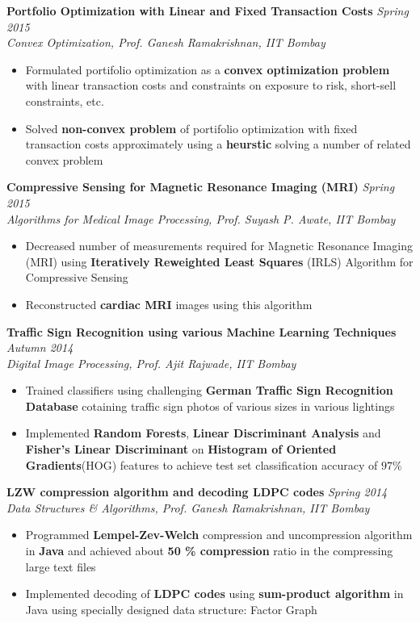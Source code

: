 \documentclass[a4paper,10pt]{article}
\newcommand{\ressubheadingWithGuide}[3]{%

	\textbf{#1} \hfill \textit{#2}\null\\
	\textit{\small #3} %
	\vspace{-4pt}
}
\begin{document}
	\ressubheadingWithGuide{Portfolio Optimization with Linear and Fixed Transaction Costs}{Spring 2015}{Convex Optimization, Prof. Ganesh Ramakrishnan, IIT Bombay}
		\begin{itemize} \itemsep -1pt
				\item Formulated portifolio optimization as a \textbf{convex optimization problem} with linear transaction costs and constraints on exposure to risk, short-sell constraints, etc.
				\item Solved \textbf{non-convex problem} of portifolio optimization with fixed transaction costs approximately using a \textbf{heurstic} solving a number of related convex problem
		\end{itemize}

	\ressubheadingWithGuide{Compressive Sensing for Magnetic Resonance Imaging (MRI)}{Spring 2015}{Algorithms for Medical Image Processing, Prof. Suyash P. Awate, IIT Bombay}
		\begin{itemize} \itemsep -1pt
				\item Decreased number of measurements required for Magnetic Resonance Imaging (MRI) using \textbf{Iteratively Reweighted Least Squares} (IRLS) Algorithm for Compressive Sensing
				\item Reconstructed \textbf{cardiac MRI} images using this algorithm
		\end{itemize}

	\ressubheadingWithGuide{Traffic Sign Recognition using various Machine Learning Techniques}{Autumn 2014}{Digital Image Processing, Prof. Ajit Rajwade, IIT Bombay}
	    \begin{itemize} \itemsep -1pt
			\item Trained classifiers using challenging \textbf{German Traffic Sign Recognition Database} cotaining traffic sign photos of various sizes in various lightings
			\item Implemented \textbf{Random Forests}, \textbf{Linear Discriminant Analysis} and \textbf{Fisher's Linear Discriminant} on \textbf{Histogram of Oriented Gradients}(HOG) features to achieve test set classification accuracy of $97\%$
		\end{itemize}

	\ressubheadingWithGuide{LZW compression algorithm and decoding LDPC codes}{Spring 2014}{Data Structures \& Algorithms, Prof. Ganesh Ramakrishnan, IIT Bombay}
		\begin{itemize}\itemsep -1pt
	    	\item Programmed \textbf{Lempel-Zev-Welch} compression and uncompression algorithm in \textbf{Java} and achieved about \textbf{50 \% compression} ratio in the compressing large text files
			\item Implemented decoding of \textbf{LDPC codes} using \textbf{sum-product algorithm} in Java using specially designed data structure: Factor Graph
		\end{itemize}
\end{document}
